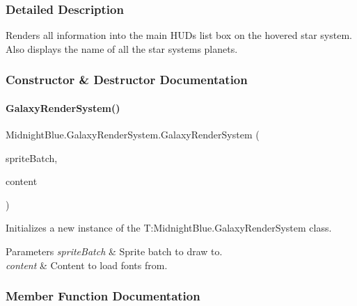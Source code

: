 \subsubsection{Detailed Description}
Renders all information into the main H\+UD\textquotesingle{}s list box on the hovered star system. Also displays the name of all the star systems planets. 



\subsubsection{Constructor \& Destructor Documentation}
\hypertarget{class_midnight_blue_1_1_galaxy_render_system_aee5d42f0287d1bfed669e2a2656c5c28}{}\label{class_midnight_blue_1_1_galaxy_render_system_aee5d42f0287d1bfed669e2a2656c5c28} 
\paragraph{\texorpdfstring{Galaxy\+Render\+System()}{GalaxyRenderSystem()}}
{\footnotesize\ttfamily Midnight\+Blue.\+Galaxy\+Render\+System.\+Galaxy\+Render\+System (\begin{DoxyParamCaption}\item[{Sprite\+Batch}]{sprite\+Batch,  }\item[{Content\+Manager}]{content }\end{DoxyParamCaption})\hspace{0.3cm}{\ttfamily [inline]}}



Initializes a new instance of the T\+:\+Midnight\+Blue.\+Galaxy\+Render\+System class. 


\begin{DoxyParams}{Parameters}
{\em sprite\+Batch} & Sprite batch to draw to.\\
\hline
{\em content} & Content to load fonts from.\\
\hline
\end{DoxyParams}


\subsubsection{Member Function Documentation}
\hypertarget{class_midnight_blue_1_1_galaxy_render_system_a269f042fe0c55e47f3b23cc1930ed71a}{}\label{class_midnight_blue_1_1_galaxy_render_system_a269f042fe0c55e47f3b23cc1930ed71a} 
